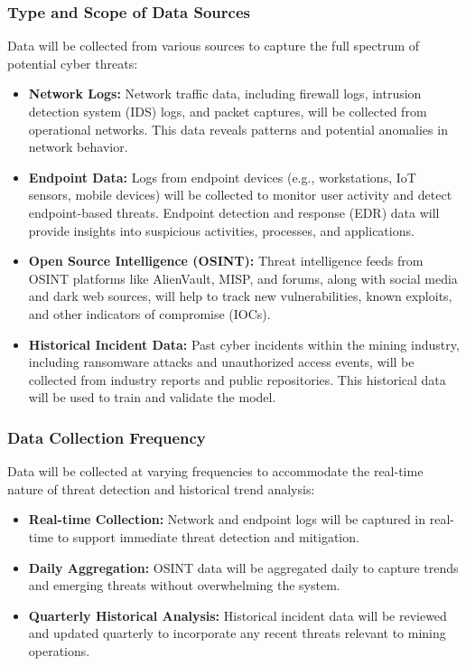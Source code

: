 \documentclass[a4paper,twoside,12pt]{report}
\begin{document}
\subsubsection{Type and Scope of Data Sources}

Data will be collected from various sources to capture the full spectrum of potential cyber threats:

\begin{itemize}
    \item \textbf{Network Logs:} Network traffic data, including firewall logs, intrusion detection system (IDS) logs, and packet captures, will be collected from operational networks. This data reveals patterns and potential anomalies in network behavior.
    
    \item \textbf{Endpoint Data:} Logs from endpoint devices (e.g., workstations, IoT sensors, mobile devices) will be collected to monitor user activity and detect endpoint-based threats. Endpoint detection and response (EDR) data will provide insights into suspicious activities, processes, and applications.
    
    \item \textbf{Open Source Intelligence (OSINT):} Threat intelligence feeds from OSINT platforms like AlienVault, MISP, and forums, along with social media and dark web sources, will help to track new vulnerabilities, known exploits, and other indicators of compromise (IOCs).
    
    \item \textbf{Historical Incident Data:} Past cyber incidents within the mining industry, including ransomware attacks and unauthorized access events, will be collected from industry reports and public repositories. This historical data will be used to train and validate the model.
\end{itemize}

\subsubsection{Data Collection Frequency}

Data will be collected at varying frequencies to accommodate the real-time nature of threat detection and historical trend analysis:

\begin{itemize}
    \item \textbf{Real-time Collection:} Network and endpoint logs will be captured in real-time to support immediate threat detection and mitigation.
    
    \item \textbf{Daily Aggregation:} OSINT data will be aggregated daily to capture trends and emerging threats without overwhelming the system.
    
    \item \textbf{Quarterly Historical Analysis:} Historical incident data will be reviewed and updated quarterly to incorporate any recent threats relevant to mining operations.
\end{itemize}
\end{document}
